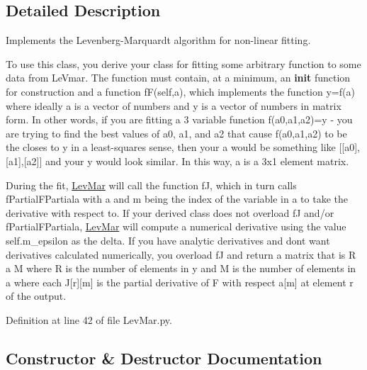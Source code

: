 \subsection{Detailed Description}
Implements the Levenberg-\/\+Marquardt algorithm for non-\/linear fitting. 

To use this class, you derive your class for fitting some arbitrary function to some data from Le\+Vmar. The function must contain, at a minimum, an {\bfseries init} function for construction and a function f\+F(self,a), which implements the function y=f(a) where ideally a is a vector of numbers and y is a vector of numbers in matrix form. In other words, if you are fitting a 3 variable function f(a0,a1,a2)=y -\/ you are trying to find the best values of a0, a1, and a2 that cause f(a0,a1,a2) to be the closes to y in a least-\/squares sense, then your a would be something like \mbox{[}\mbox{[}a0\mbox{]},\mbox{[}a1\mbox{]},\mbox{[}a2\mbox{]}\mbox{]} and your y would look similar. In this way, a is a 3x1 element matrix.

During the fit, \hyperlink{classSignalIntegrity_1_1Fit_1_1LevMar_1_1LevMar}{Lev\+Mar} will call the function fJ, which in turn calls f\+Partial\+F\+Partiala with a and m being the index of the variable in a to take the derivative with respect to. If your derived class does not overload fJ and/or f\+Partial\+F\+Partiala, \hyperlink{classSignalIntegrity_1_1Fit_1_1LevMar_1_1LevMar}{Lev\+Mar} will compute a numerical derivative using the value self.\+m\+\_\+epsilon as the delta. If you have analytic derivatives and don\textquotesingle{}t want derivatives calculated numerically, you overload fJ and return a matrix that is R a M where R is the number of elements in y and M is the number of elements in a where each J\mbox{[}r\mbox{]}\mbox{[}m\mbox{]} is the partial derivative of F with respect a\mbox{[}m\mbox{]} at element r of the output. 

Definition at line 42 of file Lev\+Mar.\+py.



\subsection{Constructor \& Destructor Documentation}
\mbox{\label{classSignalIntegrity_1_1Fit_1_1LevMar_1_1LevMar_a5580a7fcf0bfd317a8f8c7c80eefdd69}} 
